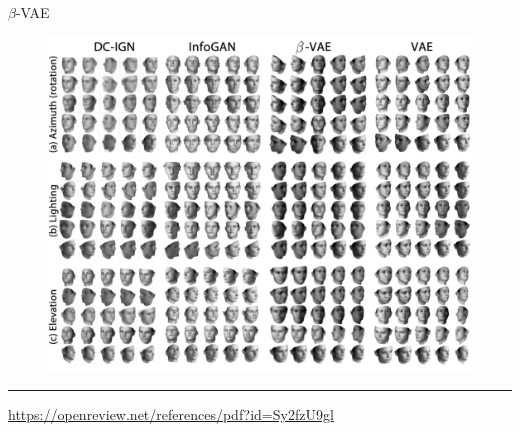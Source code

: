 \documentclass{beamer}
\begin{document}
\begin{frame}{$\beta$-VAE}
\begin{figure}
    \centering
    \includegraphics[width=0.8\linewidth]{figs/betaVAE_3.png}
\end{figure}
\vfill
\hrule\medskip
{\scriptsize \href{https://openreview.net/references/pdf?id=Sy2fzU9gl}{https://openreview.net/references/pdf?id=Sy2fzU9gl}}
\end{frame}
\end{document}
